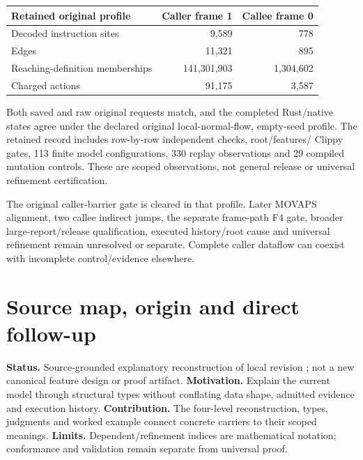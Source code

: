 \documentclass[11pt,a4paper]{article}
\newcommand{\code}[1]{\texttt{\detokenize{#1}}}
\begin{document}
\begin{center}
\begin{tabular}{@{}lrr@{}}\toprule
Retained original profile & Caller frame 1 & Callee frame 0\\\midrule
Decoded instruction sites & 9,589 & 778\\
Edges & 11,321 & 895\\
Reaching-definition memberships & 141,301,903 & 1,304,602\\
Charged actions & 91,175 & 3,587\\\bottomrule
\end{tabular}
\end{center}
Both saved and raw original requests match, and the completed Rust/native
states agree under the declared original local-normal-flow, empty-seed profile.
The retained record includes row-by-row independent checks, root/features/
Clippy gates, 113 finite model configurations, 330 replay observations and 29
compiled mutation controls. These are scoped observations, not general release
or universal refinement certification.

The original caller-barrier gate is cleared in that profile. Later MOVAPS
alignment, two callee indirect jumps, the separate frame-path F4 gate, broader
large-report/release qualification, executed history/root cause and universal
refinement remain unresolved or separate. Complete caller dataflow can coexist
with incomplete control/evidence elsewhere.

\section{Source map, origin and direct follow-up}
\label{app:sources}
\textbf{Status.} Source-grounded explanatory reconstruction of local revision
\code{184a181}; not a new canonical feature design or proof artifact.
\textbf{Motivation.} Explain the current model through structural types without
conflating data shape, admitted evidence and execution history.
\textbf{Contribution.} The four-level reconstruction, types, judgments and
worked example connect concrete carriers to their scoped meanings.
\textbf{Limits.} Dependent/refinement indices are mathematical notation;
conformance and validation remain separate from universal proof.
\end{document}
